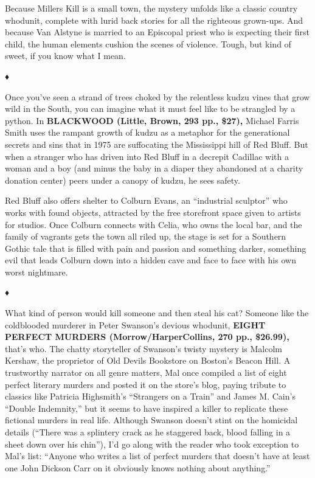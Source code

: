 Because Millers Kill is a small town, the mystery unfolds like a classic
country whodunit, complete with lurid back stories for all the righteous
grown-ups. And because Van Alstyne is married to an Episcopal priest who
is expecting their first child, the human elements cushion the scenes of
violence. Tough, but kind of sweet, if you know what I mean.

♦

Once you've seen a strand of trees choked by the relentless kudzu vines
that grow wild in the South, you can imagine what it must feel like to
be strangled by a python. In \textbf{BLACKWOOD (Little, Brown, 293 pp.,
\$27),} Michael Farris Smith uses the rampant growth of kudzu as a
metaphor for the generational secrets and sins that in 1975 are
suffocating the Mississippi hill of Red Bluff. But when a stranger who
has driven into Red Bluff in a decrepit Cadillac with a woman and a boy
(and minus the baby in a diaper they abandoned at a charity donation
center) peers under a canopy of kudzu, he sees safety.

Red Bluff also offers shelter to Colburn Evans, an ``industrial
sculptor'' who works with found objects, attracted by the free
storefront space given to artists for studios. Once Colburn connects
with Celia, who owns the local bar, and the family of vagrants gets the
town all riled up, the stage is set for a Southern Gothic tale that is
filled with pain and passion and something darker, something evil that
leads Colburn down into a hidden cave and face to face with his own
worst nightmare.

♦

What kind of person would kill someone and then steal his cat? Someone
like the coldblooded murderer in Peter Swanson's devious whodunit,
\textbf{EIGHT PERFECT MURDERS (Morrow/HarperCollins, 270 pp., \$26.99),}
that's who. The chatty storyteller of Swanson's twisty mystery is
Malcolm Kershaw, the proprietor of Old Devils Bookstore on Boston's
Beacon Hill. A trustworthy narrator on all genre matters, Mal once
compiled a list of eight perfect literary murders and posted it on the
store's blog, paying tribute to classics like Patricia Highsmith's
``Strangers on a Train'' and James M. Cain's ``Double Indemnity,'' but
it seems to have inspired a killer to replicate these fictional murders
in real life. Although Swanson doesn't stint on the homicidal details
(``There was a splintery crack as he staggered back, blood falling in a
sheet down over his chin''), I'd go along with the reader who took
exception to Mal's list: ``Anyone who writes a list of perfect murders
that doesn't have at least one John Dickson Carr on it obviously knows
nothing about anything.''

